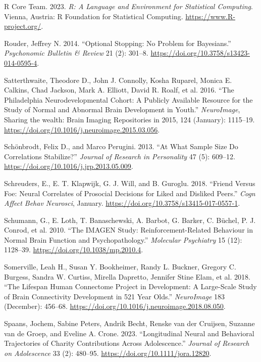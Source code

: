 \documentclass[
  letterpaper,
  DIV=11,
  numbers=noendperiod]{scrartcl}
\newlength{\cslhangindent}
\newenvironment{CSLReferences}[2] %
 {\begin{list}{}{%
  \setlength{\itemindent}{0pt}
  \setlength{\leftmargin}{0pt}
  \setlength{\parsep}{0pt}
  \ifodd #1
   \setlength{\leftmargin}{\cslhangindent}
   \setlength{\itemindent}{-1\cslhangindent}
  \fi
  \setlength{\itemsep}{#2\baselineskip}}}
 {\end{list}}
\begin{document}
\begin{CSLReferences}{1}{0}
R Core Team. 2023. \emph{R: A Language and Environment for Statistical
Computing}. Vienna, Austria: R Foundation for Statistical Computing.
\url{https://www.R-project.org/}.

Rouder, Jeffrey N. 2014. {``Optional Stopping: No Problem for
Bayesians.''} \emph{Psychonomic Bulletin \& Review} 21 (2): 301--8.
\url{https://doi.org/10.3758/s13423-014-0595-4}.

Satterthwaite, Theodore D., John J. Connolly, Kosha Ruparel, Monica E.
Calkins, Chad Jackson, Mark A. Elliott, David R. Roalf, et al. 2016.
{``The Philadelphia Neurodevelopmental Cohort: A Publicly Available
Resource for the Study of Normal and Abnormal Brain Development in
Youth.''} \emph{NeuroImage}, Sharing the wealth: Brain Imaging
Repositories in 2015, 124 (January): 1115--19.
\url{https://doi.org/10.1016/j.neuroimage.2015.03.056}.

Schönbrodt, Felix D., and Marco Perugini. 2013. {``At What Sample Size
Do Correlations Stabilize?''} \emph{Journal of Research in Personality}
47 (5): 609--12. \url{https://doi.org/10.1016/j.jrp.2013.05.009}.

Schreuders, E., E. T. Klapwijk, G. J. Will, and B. Guroglu. 2018.
{``Friend Versus Foe: Neural Correlates of Prosocial Decisions for Liked
and Disliked Peers.''} \emph{Cogn Affect Behav Neurosci}, January.
\url{https://doi.org/10.3758/s13415-017-0557-1}.

Schumann, G., E. Loth, T. Banaschewski, A. Barbot, G. Barker, C. Büchel,
P. J. Conrod, et al. 2010. {``The IMAGEN Study: Reinforcement-Related
Behaviour in Normal Brain Function and Psychopathology.''}
\emph{Molecular Psychiatry} 15 (12): 1128--39.
\url{https://doi.org/10.1038/mp.2010.4}.

Somerville, Leah H., Susan Y. Bookheimer, Randy L. Buckner, Gregory C.
Burgess, Sandra W. Curtiss, Mirella Dapretto, Jennifer Stine Elam, et
al. 2018. {``The Lifespan Human Connectome Project in Development: A
Large-Scale Study of Brain Connectivity Development in 5{\textendash}21
Year Olds.''} \emph{NeuroImage} 183 (December): 456--68.
\url{https://doi.org/10.1016/j.neuroimage.2018.08.050}.

Spaans, Jochem, Sabine Peters, Andrik Becht, Renske van der Cruijsen,
Suzanne van de Groep, and Eveline A. Crone. 2023. {``Longitudinal Neural
and Behavioral Trajectories of Charity Contributions Across
Adolescence.''} \emph{Journal of Research on Adolescence} 33 (2):
480--95. \url{https://doi.org/10.1111/jora.12820}.


\end{CSLReferences}
\end{document}
